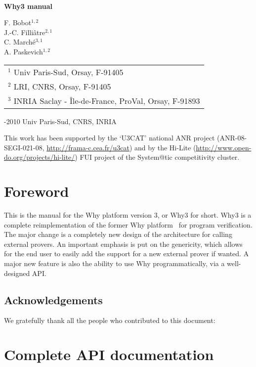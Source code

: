 \documentclass[a4paper]{memoir}
\begin{document}
\thispagestyle{empty}

\begin{center}

~

\vfill

{\Huge\bfseries Why3 manual}

\vfill

{\Large F. Bobot$^{1,2}$ \\ 
J.-C. Filli\^atre$^{2,1}$  \\ 
C. March\'e$^{3,1}$ \\ 
A. Paskevich$^{1,2}$}

\vfill

\begin{tabular}{l}
$^1$ Univ Paris-Sud, Orsay, F-91405 \\
$^2$ LRI, CNRS, Orsay, F-91405 \\
$^3$ INRIA Saclay - \^Ile-de-France, ProVal, Orsay, F-91893 
\end{tabular}

\vfill

\begin{flushleft}
  -2010 Univ Paris-Sud, CNRS, INRIA

  This work has been supported by the `U3CAT' national ANR project
  (ANR-08-SEGI-021-08, \url{http://frama-c.cea.fr/u3cat}) and by the
  Hi-Lite (\url{http://www.open-do.org/projects/hi-lite/}) FUI project of the
  System@tic competitivity cluster.

\end{flushleft}
\end{center}

\cleardoublepage

\tableofcontents

\chapter*{Foreword}

This is the manual for the Why platform version 3, or Why3 for
short. Why3 is a complete reimplementation of the former Why
platform~\cite{filliatre07cav} for program verification.  The major
change is a completely new design of the architecture for calling
external provers. An important emphasis is put on the genericity,
which allows for the end user to easily add the support for a new
external prover if wanted.  A major new feature is also the ability
to use Why programmatically, via a well-designed API.

\section*{Acknowledgements}

We gratefully thank all the people who contributed to this document:











\chapter{Complete API documentation}
\label{chap:apidoc}





\end{document}
